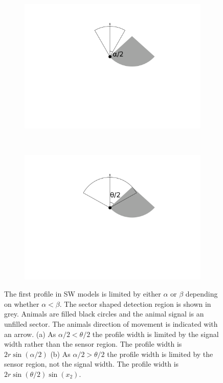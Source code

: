 \begin{figure}[t]
        \centering
        \begin{subfigure}[t]{0.35\textwidth}
                \centering
        \includegraphics[width=1\textwidth, trim=7cm 10cm 6cm 1cm]{imgs/forward.pdf}
                \caption{}
                \label{f:SWforward} %
        \end{subfigure}
~ 
        \begin{subfigure}[t]{0.35\textwidth}
                \centering
        \includegraphics[width=1\textwidth, trim=7cm 10cm 6cm 1cm]{imgs/forward2.pdf}
                \caption{}
                \label{f:SWforwad2}
        \end{subfigure}

\caption{The first profile in SW models is limited by either $\alpha$ or $\beta$ depending on whether $\alpha < \beta$.  The sector shaped detection region is shown in grey. Animals are filled black circles and the animal signal is an unfilled sector. The animals direction of movement is indicated with an arrow. (a)  As $\alpha/2 < \theta/2$ the profile width is limited by the signal width rather than the sensor region. The profile width is $2r\sin\left(\alpha/2\right)$ (b) As $\alpha/2 > \theta/2$ the profile width is limited by the sensor region, not the signal width. The profile width is $2r\sin\left(\theta/2\right)\sin(x_2)$.    }
\label{f:forward}
\end{figure}


